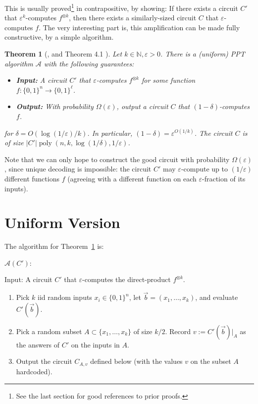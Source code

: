 \documentclass[]{article}
\newtheorem{theorem}{Theorem}
\newcommand{\1}{\mathbb{1}}
\newcommand{\N}{\mathbb{N}}
\renewcommand{\epsilon}{\varepsilon}
\newcommand{\eps}{\epsilon}
\DeclareMathOperator*{\poly}{poly}
\newcommand{\A}{\mathcal{A}}
\newcommand{\ox}{\otimes}
\begin{document}
This is usually proved\footnote{See the last section for good references to prior
proofs.}
in contrapositive, by showing: If there exists a circuit
$C'$ that $\eps^k$-computes $f^{\ox k}$, then there exists a similarly-sized circuit
$C$ that $\eps$-computes $f$.
The very interesting part is, this amplification can be made fully constructive,
by a simple algorithm.
\begin{theorem}[\cite{IJKW}, and Theorem 4.1 \cite{learning}]
    \label{thm:uniformDP}
Let $k \in \N, \eps > 0$.
There is a (uniform) PPT algorithm $\A$ with the following guarantees:
\begin{itemize}
    \item {\bf Input:} A circuit $C'$ that $\eps$-computes $f^{\ox k}$ for some
        function $f:\{0,1\}^n \to \{0, 1\}^\ell$.
    \item {\bf Output:} With probability $\Omega(\eps)$, output a circuit $C$
        that $(1-\delta)$-computes $f$.
\end{itemize}
for $\delta = O(\log(1/\eps)/k)$.
In particular, $(1-\delta) = \eps^{O(1/k)}$.
The circuit $C$ is of size $|C'|\poly(n, k, \log(1/\delta), 1/\eps)$.
\end{theorem}

Note that we can only hope to construct the good circuit with probability
$\Omega(\eps)$, since unique decoding is impossible: the circuit
$C'$ may $\eps$-compute up to $(1/\eps)$ different functions $f$
(agreeing with a different function on each $\eps$-fraction of its inputs).


\section{Uniform Version}

The algorithm for Theorem~\ref{thm:uniformDP} is:
\begin{mdframed}
$\mathcal{A}(C')$:

Input: A circuit $C'$
that $\eps$-computes the direct-product $f^{\ox k}$.
\begin{enumerate}
    \item Pick $k$ iid random inputs
        $x_i \in \{0, 1\}^n$,
        let $\vec b = (x_1, \dots, x_k)$,
        and evaluate $C'(\vec b)$.
    \item Pick a random subset $A \subset \{x_1, \dots, x_k\}$ of size $k/2$.
        Record $v := C'(\vec b)|_A$ as the answers of $C'$ on the inputs in $A$.
    \item Output the circuit $C_{A, v}$
defined below (with the values $v$ on the subset $A$ hardcoded).
\end{enumerate}
\end{mdframed}
\end{document}
